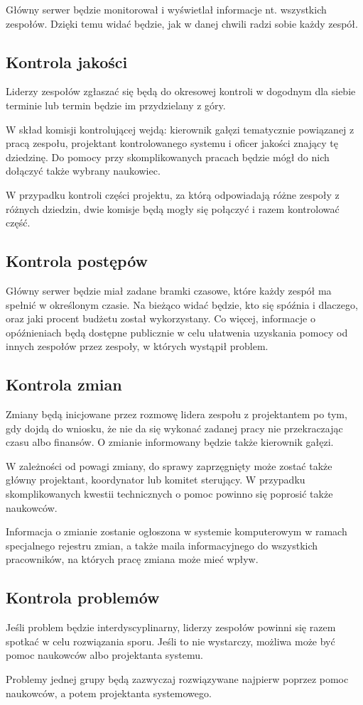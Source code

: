 Główny serwer będzie monitorował i wyświetlał informacje nt. wszystkich zespołów.
Dzięki temu widać będzie, jak w danej chwili radzi sobie każdy zespół.

\subsection{Kontrola jakości}
Liderzy zespołów zgłaszać się będą do okresowej kontroli w dogodnym dla siebie terminie lub termin będzie im przydzielany z góry.

W skład komisji kontrolującej wejdą: kierownik gałęzi tematycznie powiązanej z pracą zespołu, projektant kontrolowanego systemu i oficer jakości znający tę dziedzinę.
Do pomocy przy skomplikowanych pracach będzie mógł do nich dołączyć także wybrany naukowiec.

W przypadku kontroli części projektu, za którą odpowiadają różne zespoły z różnych dziedzin, dwie komisje będą mogły się połączyć i razem kontrolować część.

\subsection{Kontrola postępów}
Główny serwer będzie miał zadane bramki czasowe, które każdy zespół ma spełnić w określonym czasie. Na bieżąco widać będzie, kto się spóźnia i dlaczego, oraz jaki procent budżetu został wykorzystany.
Co więcej, informacje o opóźnieniach będą dostępne publicznie w celu ułatwenia uzyskania pomocy od innych zespołów przez zespoły, w których wystąpił problem.

\subsection{Kontrola zmian}
Zmiany będą inicjowane przez rozmowę lidera zespołu z projektantem po tym, gdy dojdą do wniosku, że nie da się wykonać zadanej pracy nie przekraczając czasu albo finansów.
O zmianie informowany będzie także kierownik gałęzi.

W zależności od powagi zmiany, do sprawy zaprzęgnięty może zostać także główny projektant, koordynator lub komitet sterujący.
W przypadku skomplikowanych kwestii technicznych o pomoc powinno się poprosić także naukowców.

Informacja o zmianie zostanie ogłoszona w systemie komputerowym w ramach specjalnego rejestru zmian, a także maila informacyjnego do wszystkich pracowników, na których pracę zmiana może mieć wpływ.

\subsection{Kontrola problemów}
Jeśli problem będzie interdyscyplinarny, liderzy zespołów powinni się razem spotkać w celu rozwiązania sporu.
Jeśli to nie wystarczy, możliwa może być pomoc naukowców albo projektanta systemu.

Problemy jednej grupy będą zazwyczaj rozwiązywane najpierw poprzez pomoc naukowców, a potem projektanta systemowego.


